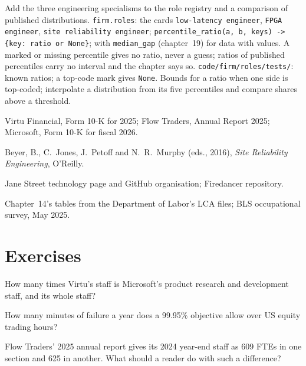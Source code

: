 \begin{build}
 Add the three engineering specialisms to the role registry and a comparison of published distributions.
 \texttt{firm.roles}: the cards \texttt{low-latency engineer}, \texttt{FPGA engineer},
\texttt{site reliability engineer}; \texttt{percentile\_ratio(a, b, keys) -> \{key: ratio or None\}}; with
\texttt{median\_gap} (chapter~19) for data with values.
 A marked or missing percentile gives no ratio, never a guess; ratios of published percentiles carry no
interval and the chapter says so.
 \texttt{code/firm/roles/tests/}: known ratios; a top-code mark gives \texttt{None}.
 Bounds for a ratio when one side is top-coded; interpolate a distribution from its five percentiles and
compare shares above a threshold.
\end{build}

\begin{omsources}
\item Virtu Financial, Form 10-K for 2025; Flow Traders, Annual Report 2025; Microsoft, Form 10-K for fiscal 2026.
\item Beyer, B., C.~Jones, J.~Petoff and N.~R.~Murphy (eds., 2016), \emph{Site Reliability Engineering}, O'Reilly.
\item Jane Street technology page and GitHub organisation; Firedancer repository.
\item Chapter~14's tables from the Department of Labor's LCA files; BLS occupational survey, May 2025.
\end{omsources}

\section{Exercises}

\begin{exercise}[$\star$]\label{exo:in:software-engineer:1}
How many times Virtu's staff is Microsoft's product research and development staff, and its whole staff?
\end{exercise}

\begin{exercise}[$\star$]\label{exo:in:software-engineer:2}
How many minutes of failure a year does a 99.95\% objective allow over US equity trading hours?
\end{exercise}

\begin{exercise}[$\star$]\label{exo:in:software-engineer:3}
Flow Traders' 2025 annual report gives its 2024 year-end staff as 609 FTEs in one section and 625 in another. What should
a reader do with such a difference?
\end{exercise}

